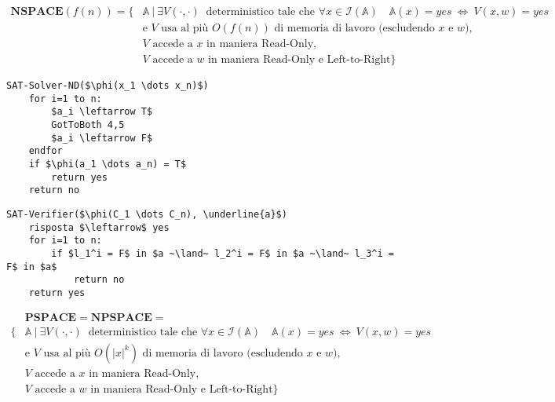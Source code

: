 \documentclass[a4paper]{article}
\theoremstyle{definition}
\newcommand{\pspace}{\mathbf{PSPACE}}
\newcommand{\nspace}{\mathbf{NSPACE}}
\newcommand{\npspace}{\mathbf{NPSPACE}}
\newcommand{\prob}[1]{\mathbb{#1}}
\newcommand{\instance}[1]{\mathcal{I}(\prob{#1})}
\begin{document}
		\begin{align*}
			\nspace (f(n)) = \big\lbrace & \prob{A}\ |\ \exists V(\cdot, \cdot)\ \text{ deterministico tale che } \forall x \in\instance{A} \quad \prob{A}(x) = yes\ \Leftrightarrow\ V(x, w)= yes \\
			&\text{e } V \text{ usa al più } O(f(n)) \text{ di memoria di lavoro (escludendo } x \text{ e } w\text{), }\\ 
			&V \text{ accede a } x \text{ in maniera Read-Only,} \\
			&V \text{ accede a } w \text{ in maniera Read-Only e Left-to-Right} \big\rbrace
		\end{align*}

	\begin{lstlisting}[mathescape=true, frame=tb, caption={SAT-Solver-ND $\in \npspace(n)$}, basicstyle=\footnotesize\ttfamily]
SAT-Solver-ND($\phi(x_1 \dots x_n)$)
	for i=1 to n:
    	$a_i \leftarrow T$
		GotToBoth 4,5
		$a_i \leftarrow F$
	endfor
	if $\phi(a_1 \dots a_n) = T$
		return yes
	return no
			\end{lstlisting}

		\begin{lstlisting}[mathescape=true, frame=tb, caption={SAT-Verifier}, basicstyle=\footnotesize\ttfamily]
SAT-Verifier($\phi(C_1 \dots C_n), \underline{a}$)
	risposta $\leftarrow$ yes
	for i=1 to n:
		if $l_1^i = F$ in $a ~\land~ l_2^i = F$ in $a ~\land~ l_3^i = F$ in $a$
			return no
	return yes
		\end{lstlisting}
		
		\begin{align*}
			&\pspace = \npspace = \\\big\lbrace & \prob{A}\ |\ \exists V(\cdot, \cdot)\ \text{ deterministico tale che } \forall x \in\instance{A} \quad \prob{A}(x) = yes\ \Leftrightarrow\ V(x, w)= yes \\
			&\text{e } V \text{ usa al più } O(|x|^k) \text{ di memoria di lavoro (escludendo } x \text{ e } w\text{), }\\ 
			&V \text{ accede a } x \text{ in maniera Read-Only,} \\
			&V \text{ accede a } w \text{ in maniera Read-Only e Left-to-Right} \big\rbrace
		\end{align*}
		
\end{document}
